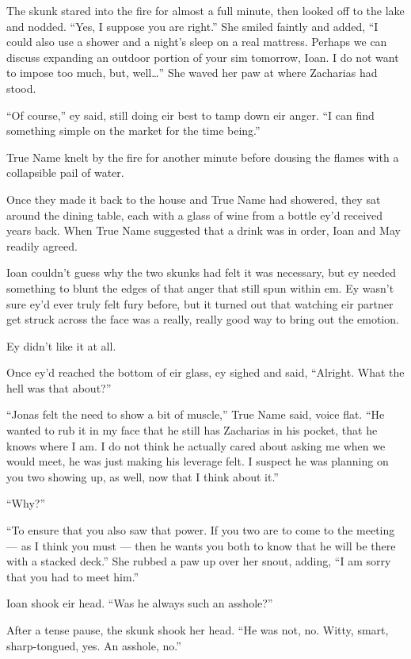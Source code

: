 The skunk stared into the fire for almost a full minute, then looked off to the lake and nodded. ``Yes, I suppose you are right.'' She smiled faintly and added, ``I could also use a shower and a night's sleep on a real mattress. Perhaps we can discuss expanding an outdoor portion of your sim tomorrow, Ioan. I do not want to impose too much, but, well\ldots{}'' She waved her paw at where Zacharias had stood.

``Of course,'' ey said, still doing eir best to tamp down eir anger. ``I can find something simple on the market for the time being.''

True Name knelt by the fire for another minute before dousing the flames with a collapsible pail of water.

Once they made it back to the house and True Name had showered, they sat around the dining table, each with a glass of wine from a bottle ey'd received years back. When True Name suggested that a drink was in order, Ioan and May readily agreed.

Ioan couldn't guess why the two skunks had felt it was necessary, but ey needed something to blunt the edges of that anger that still spun within em. Ey wasn't sure ey'd ever truly felt fury before, but it turned out that watching eir partner get struck across the face was a really, really good way to bring out the emotion.

Ey didn't like it at all.

Once ey'd reached the bottom of eir glass, ey sighed and said, ``Alright. What the hell was that about?''

``Jonas felt the need to show a bit of muscle,'' True Name said, voice flat. ``He wanted to rub it in my face that he still has Zacharias in his pocket, that he knows where I am. I do not think he actually cared about asking me when we would meet, he was just making his leverage felt. I suspect he was planning on you two showing up, as well, now that I think about it.''

``Why?''

``To ensure that you also saw that power. If you two are to come to the meeting — as I think you must — then he wants you both to know that he will be there with a stacked deck.'' She rubbed a paw up over her snout, adding, ``I am sorry that you had to meet him.''

Ioan shook eir head. ``Was he always such an asshole?''

After a tense pause, the skunk shook her head. ``He was not, no. Witty, smart, sharp-tongued, yes. An asshole, no.''

